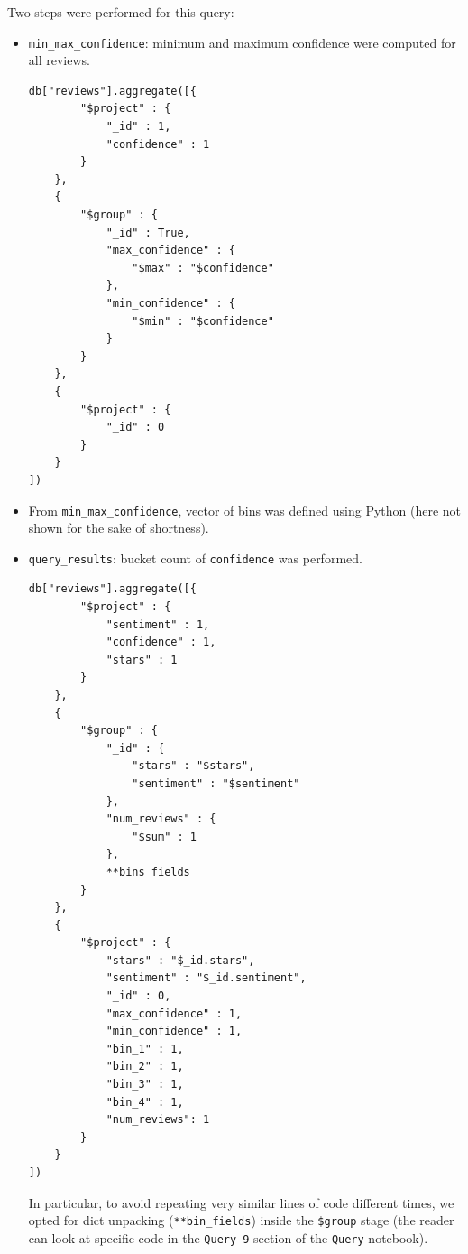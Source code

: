 \documentclass{Configuration_Files/PoliMi3i_thesis}
\begin{document}
Two steps were performed for this query:
\begin{itemize}
\item \texttt{min\_max\_confidence}: minimum and maximum confidence were computed for all reviews. 

\bigskip

\begin{lstlisting}[style = mongodb]
    db["reviews"].aggregate([{
        "$project" : {
            "_id" : 1,
            "confidence" : 1
        }
    },
    {
        "$group" : {
            "_id" : True,
            "max_confidence" : {
                "$max" : "$confidence"
            },
            "min_confidence" : {
                "$min" : "$confidence"
            }
        }
    },
    {
        "$project" : {
            "_id" : 0
        }
    }
])
\end{lstlisting}

\bigskip

\item From \texttt{min\_max\_confidence}, vector of bins was defined using Python (here not shown for the sake of shortness).

\item \texttt{query\_results}: bucket count of \texttt{confidence} was performed.

\bigskip

\begin{lstlisting}[style = mongodb]
db["reviews"].aggregate([{
        "$project" : {
            "sentiment" : 1,
            "confidence" : 1,
            "stars" : 1
        }
    },
    {
        "$group" : {
            "_id" : {
                "stars" : "$stars",
                "sentiment" : "$sentiment"
            },
            "num_reviews" : {
                "$sum" : 1
            },
            **bins_fields
        }
    },
    {
        "$project" : {
            "stars" : "$_id.stars",
            "sentiment" : "$_id.sentiment",
            "_id" : 0,
            "max_confidence" : 1,
            "min_confidence" : 1,
            "bin_1" : 1,
            "bin_2" : 1, 
            "bin_3" : 1,
            "bin_4" : 1,
            "num_reviews": 1
        }
    }
])
\end{lstlisting}

\bigskip

In particular, to avoid repeating very similar lines of code different times, we opted for dict unpacking (\texttt{**bin\_fields}) inside the \texttt{\$group} stage (the reader can look at specific code in the \texttt{Query 9} section of the \texttt{Query} notebook).

\end{itemize}
\end{document}
